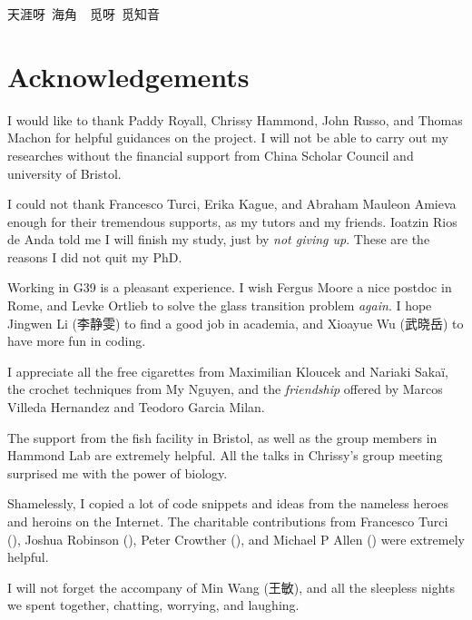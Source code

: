 \documentclass[11pt,twoside]{report}
\begin{document}
{\selectfont 
\Large{天涯呀~海角~~觅呀~觅知音}
}

\cleardoublepage



\cleardoublepage

\chapter*{Acknowledgements}

I would like to thank Paddy Royall, Chrissy Hammond, John Russo, and Thomas Machon for helpful guidances on the project. I will not be able to carry out my researches  without the financial support from China Scholar Council and university of Bristol.


I could not thank Francesco Turci, Erika Kague, and Abraham Mauleon Amieva enough for their tremendous supports, as my tutors and my friends. Ioatzin Rios de Anda told me I will finish my study, just by \emph{not giving up}. These are the reasons I did not quit my PhD.


Working in G39 is a pleasant experience. I wish Fergus Moore a nice postdoc in Rome, and Levke Ortlieb to solve the glass transition problem \emph{again}. I hope Jingwen Li (李静雯) to find a good job in academia, and Xioayue Wu (武晓岳) to have more fun in coding.


I appreciate all the free cigarettes from Maximilian Kloucek and Nariaki Sakaï, the crochet techniques from My Nguyen, and the \emph{friendship} offered by Marcos Villeda Hernandez and Teodoro Garcia Milan.


The support from the fish facility in Bristol, as well as the group members in Hammond Lab are extremely helpful. All the talks in Chrissy's group meeting surprised me with the power of biology.


Shamelessly, I copied a lot of code snippets and ideas from the nameless heroes and heroins on the Internet. The charitable contributions from Francesco Turci (), Joshua Robinson (), Peter Crowther (), and Michael P Allen () were extremely helpful.


I will not forget the accompany of Min Wang (王敏), and all the sleepless nights we spent together, chatting, worrying, and laughing.
\end{document}
